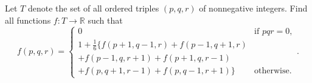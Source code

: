 Let $T$ denote the set of all ordered triples $\left(p,q,r\right)$ of nonnegative integers. Find all functions $f:T\rightarrow\mathbb{R}$ such that \[f\left(p,q,r\right)=\begin{cases}
	0 & \text{if }pqr=0,\\
	1+\frac{1}{6}\{f\left(p+1,q-1,r\right)+f\left(p-1,q+1,r\right)&\\+f\left(p-1,q,r+1\right)+f\left(p+1,q,r-1\right)&\\+f\left(p,q+1,r-1\right)+f\left(p,q-1,r+1\right)\} & \text{otherwise.}\end{cases}.\]